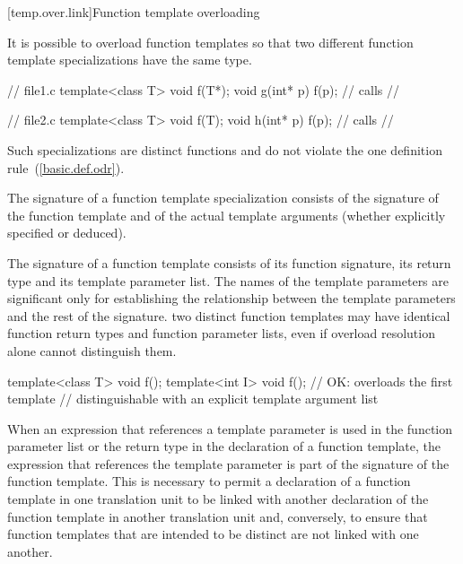 [temp.over.link]{Function template overloading}

\pnum
{}%
It is possible to overload function templates so that two different
function template specializations have the same type.
\enterexample

\begin{minipage}{.45\hsize}
\begin{codeblock}
// file1.c
template<class T>
    void f(T*);
void g(int* p) {
    f(p); // calls
	  // 
}
\end{codeblock}
\end{minipage}
\begin{minipage}{.45\hsize}
\begin{codeblock}
// file2.c
template<class T>
    void f(T);
void h(int* p) {
    f(p); // calls
          // 
}
\end{codeblock}
\end{minipage}

\exitexampleb

\pnum
Such specializations are distinct functions and do not violate the one
definition rule~(\ref{basic.def.odr}).

\pnum
The signature of a function template specialization consists of the
signature of the function template and of the actual template arguments
(whether explicitly specified or deduced).

\pnum
The signature of a function template consists of its function signature,
its return type and its template parameter list.
The names of the template parameters are significant only for establishing
the relationship between the template parameters and the rest of the
signature.
\enternote
two distinct function templates may have identical function return types and
function parameter lists, even if overload resolution alone cannot distinguish
them.

\begin{codeblock}
template<class T> void f();
template<int I> void f();       // OK: overloads the first template
                                // distinguishable with an explicit template argument list
\end{codeblock}
\exitnoteb

\pnum
When an expression that references a template parameter is used in the
function parameter list or the return type in the declaration of a
function template, the expression that references the template
parameter is part of the signature of the function template.
This is
necessary to permit a declaration of a function template in one
translation unit to be linked with another declaration of the function
template in another translation unit and, conversely, to ensure that
function templates that are intended to be distinct are not linked
with one another.
\enterexample

